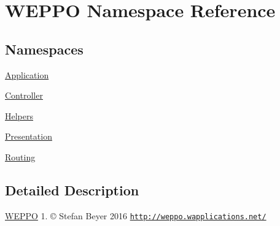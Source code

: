 \hypertarget{namespaceWEPPO}{}\section{W\+E\+P\+PO Namespace Reference}
\label{namespaceWEPPO}
\subsection*{Namespaces}
\begin{DoxyCompactItemize}
\item 
 \hyperlink{namespaceWEPPO_1_1Application}{Application}
\item 
 \hyperlink{namespaceWEPPO_1_1Controller}{Controller}
\item 
 \hyperlink{namespaceWEPPO_1_1Helpers}{Helpers}
\item 
 \hyperlink{namespaceWEPPO_1_1Presentation}{Presentation}
\item 
 \hyperlink{namespaceWEPPO_1_1Routing}{Routing}
\end{DoxyCompactItemize}


\subsection{Detailed Description}
\hyperlink{namespaceWEPPO}{W\+E\+P\+PO} 1. © Stefan Beyer 2016 \href{http://weppo.wapplications.net/}{\tt http\+://weppo.\+wapplications.\+net/} 